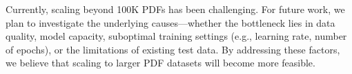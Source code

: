 Currently, scaling beyond 100K PDFs has been challenging.
For future work, we plan to investigate the underlying causes—whether the bottleneck lies in data quality, model capacity, suboptimal training settings (e.g., learning rate, number of epochs), or the limitations of existing test data.
By addressing these factors, we believe that scaling to larger PDF datasets will become more feasible.